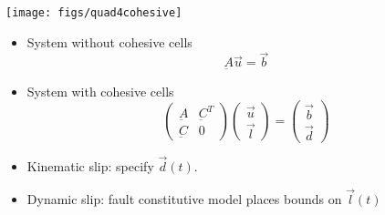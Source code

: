 \documentclass[pdftex,cig,slideColor]{pp4slides}
\begin{document}
 
  \vfill
  \begin{center}
    \texttt{[image: figs/quad4cohesive]}
  \end{center}


  \begin{itemize}
  \item System without cohesive cells
    \begin{equation}
      \underbar{A} \vec{u} = \vec{b} \nonumber
    \end{equation}
  \item System with cohesive cells
    \begin{equation}
      \left( \begin{array}{cc}
          \underbar{A} & \underbar{C}^T\\
          \underbar{C} & 0
        \end{array} \right)
      \left( \begin{array}{c}
          \vec{u}\\
          \vec{l}
        \end{array}\right)
      =
      \left( \begin{array}{c}
          \vec{b}\\
          \vec{d}
        \end{array} \right)
      \nonumber
    \end{equation}
  \item Kinematic slip: specify $\vec{d}(t)$.
  \item Dynamic slip: fault constitutive model places bounds on $\vec{l}(t)$
  \end{itemize}
  
 
\end{document}
